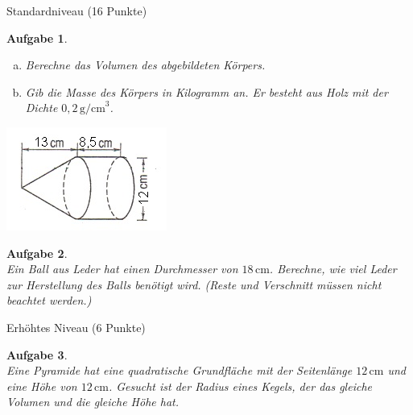 \documentclass[11pt,fleqn]{article}
\theoremstyle{aufg}
\newtheorem{aufgabe}{Aufgabe}
\theoremstyle{bsp}
\begin{document}
\begin{flushleft}
\begin{center} \begin{framed} Standardniveau (16 Punkte) \end{framed} \end{center}\begin{aufgabe} ~ \\ 
\begin{enumerate}[a)]
\item Berechne das Volumen des abgebildeten K\"orpers.
\item Gib die Masse des K\"orpers in Kilogramm an. Er besteht aus Holz mit der Dichte $0,2\mathrm{\,g/cm}^3$.
\end{enumerate}
\includegraphics{bilder/zylinderkegel.png}
\end{aufgabe} 
\begin{aufgabe} ~ \\ 
Ein Ball aus Leder hat einen Durchmesser von $18\mathrm{\,cm}$. Berechne, wie viel Leder zur Herstellung des Balls ben\"otigt wird. (Reste und Verschnitt m\"ussen nicht beachtet werden.)
\end{aufgabe} 
\begin{center} \begin{framed} Erh\"ohtes Niveau (6 Punkte) \end{framed} \end{center}\begin{aufgabe} ~ \\ 
Eine Pyramide hat eine quadratische Grundfl\"ache mit der Seitenl\"ange $12\mathrm{\,cm}$  und eine H\"ohe von $12\mathrm{\,cm}$. Gesucht ist der Radius eines Kegels, der das gleiche Volumen und die gleiche H\"ohe hat.
\end{aufgabe} 
\end{flushleft} 
    
\end{document}
